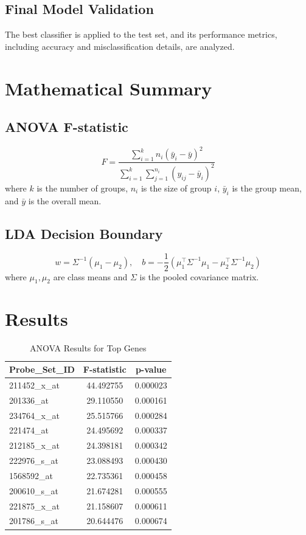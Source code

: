 \documentclass[final]{article}
\begin{document}
\subsection*{Final Model Validation}
The best classifier is applied to the test set, and its performance metrics, including accuracy and misclassification details, are analyzed.

\section*{Mathematical Summary}
\subsection*{ANOVA F-statistic}
\begin{equation}
    F = \frac{\sum_{i=1}^k n_i (\bar{y}_i - \bar{y})^2}{\sum_{i=1}^k \sum_{j=1}^{n_i} (y_{ij} - \bar{y}_i)^2}
\end{equation}
where $k$ is the number of groups, $n_i$ is the size of group $i$, $\bar{y}_i$ is the group mean, and $\bar{y}$ is the overall mean.

\subsection*{LDA Decision Boundary}
\begin{equation}
    w = \Sigma^{-1} (\mu_1 - \mu_2), \quad b = -\frac{1}{2} (\mu_1^\top \Sigma^{-1} \mu_1 - \mu_2^\top \Sigma^{-1} \mu_2)
\end{equation}
where $\mu_1, \mu_2$ are class means and $\Sigma$ is the pooled covariance matrix.

\section*{Results}

\begin{table}[H]
\centering
\caption{ANOVA Results for Top Genes}
\label{table:anova-results}
\begin{tabular}{lcc}
\toprule
\textbf{Probe\_Set\_ID} & \textbf{F-statistic} & \textbf{p-value} \\ 
\midrule
211452\_x\_at & 44.492755 & 0.000023 \\
201336\_at    & 29.110550 & 0.000161 \\
234764\_x\_at & 25.515766 & 0.000284 \\
221474\_at    & 24.495692 & 0.000337 \\
212185\_x\_at & 24.398181 & 0.000342 \\
222976\_s\_at & 23.088493 & 0.000430 \\
1568592\_at   & 22.735361 & 0.000458 \\
200610\_s\_at & 21.674281 & 0.000555 \\
221875\_x\_at & 21.158607 & 0.000611 \\
201786\_s\_at & 20.644476 & 0.000674 \\
\bottomrule
\end{tabular}
\end{table}
\end{document}
